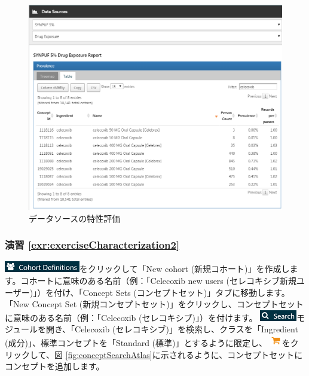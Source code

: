 \documentclass[
  11pt]{book}
\theoremstyle{definition}
\theoremstyle{definition}
\theoremstyle{definition}
\theoremstyle{definition}
\theoremstyle{remark}
\begin{document}
\begin{figure}

{\centering \includegraphics[width=1\linewidth]{images/SuggestedAnswers/dataSourcesAtlas} 

}

\caption{データソースの特性評価}\label{fig:dataSourcesAtlas}
\end{figure}

\subsubsection*{演習 \ref{exr:exerciseCharacterization2}}\label{ux6f14ux7fd2-refexrexercisecharacterization2}

\includegraphics{images/Cohorts/cohortdefinition.png}をクリックして「New cohort (新規コホート)」を作成します。コホートに意味のある名前（例：「Celecoxib new users (セレコキシブ新規ユーザー)」）を付け、「Concept Sets (コンセプトセット)」タブに移動します。「New Concept Set (新規コンセプトセット)」をクリックし、コンセプトセットに意味のある名前（例：「Celecoxib (セレコキシブ)」）を付けます。 \includegraphics{images/Cohorts/search-2.png}モジュールを開き、「Celecoxib (セレコキシブ)」を検索し、クラスを「Ingredient (成分)」、標準コンセプトを「Standard (標準)」とするように限定し、 \includegraphics{images/Cohorts/shoppingcart.png}をクリックして、図 \ref{fig:conceptSearchAtlas}に示されるように、コンセプトセットにコンセプトを追加します。
\end{document}
